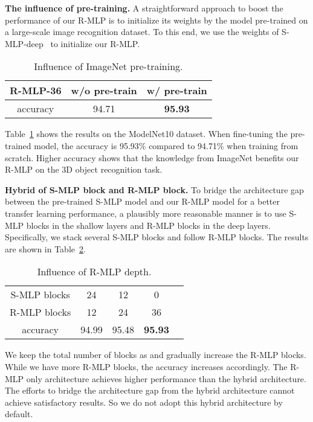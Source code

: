 \documentclass[11pt]{article}
\begin{document}
\vspace{0.1in}\noindent\textbf{The influence of pre-training.}
A straightforward approach to boost the performance of our R-MLP is to initialize its weights by the model pre-trained on a large-scale image recognition dataset. To this end, we use the weights of S-MLP-deep~\citep{yu2022s2mlp} to initialize our R-MLP.


\begin{table}[htb!]
\caption{Influence of ImageNet pre-training.}
\label{tab:pretrain}\centering
\begin{tabular}{ccc}
\toprule
R-MLP-36 & w/o pre-train & w/ pre-train \\
\midrule
accuracy & 94.71 & \textbf{95.93} \\
\bottomrule
\end{tabular}
\end{table}

Table~\ref{tab:pretrain} shows the results on the ModelNet10 dataset.  When fine-tuning the pre-trained model, the accuracy is 95.93\% compared to 94.71\% when training from scratch. Higher accuracy shows that the knowledge from ImageNet benefits our R-MLP on the 3D object recognition task.





\vspace{0.2in}\noindent\textbf{Hybrid of S\texorpdfstring{}{\texttwosuperior}-MLP block and R\texorpdfstring{}{\texttwosuperior}-MLP block.}
To bridge the architecture gap between the pre-trained S-MLP model and our R-MLP model for a better transfer learning performance, a plausibly more reasonable manner is to use  S-MLP blocks in the shallow layers and R-MLP blocks in the deep layers. Specifically, we stack several S-MLP blocks and follow R-MLP blocks. The results are shown in Table~\ref{tab:hybrid}.

\begin{table}[ht]
\caption{Influence of R-MLP depth.}\label{tab:hybrid}
\centering
\begin{tabular}{ccccc}
\toprule
S-MLP blocks & 24 & 12 & 0 \\
R-MLP blocks & 12 & 24 & 36 \\
\midrule
accuracy & 94.99 & 95.48 & \textbf{95.93} \\
\bottomrule
\end{tabular}
\end{table}


We keep the total number of blocks as  and gradually increase the R-MLP blocks. While we have more R-MLP blocks, the accuracy increases accordingly. The R-MLP only architecture achieves higher performance than the hybrid architecture. The efforts to bridge the architecture gap from the hybrid architecture cannot achieve satisfactory results. So we do not adopt this hybrid architecture by default.
\end{document}
